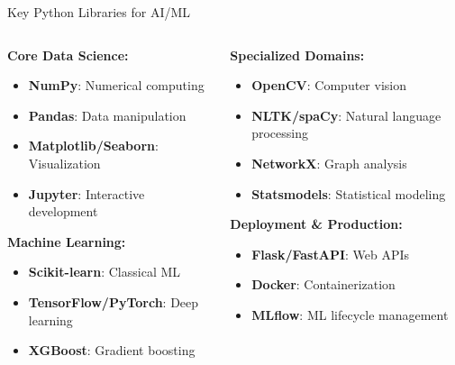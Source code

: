 \begin{frame}{Key Python Libraries for AI/ML}
    \begin{columns}
        \begin{column}{0.5\textwidth}
            \textbf{Core Data Science:}
            \begin{itemize}
                \item \textbf{NumPy}: Numerical computing
                \item \textbf{Pandas}: Data manipulation
                \item \textbf{Matplotlib/Seaborn}: Visualization
                \item \textbf{Jupyter}: Interactive development
            \end{itemize}
            
            \textbf{Machine Learning:}
            \begin{itemize}
                \item \textbf{Scikit-learn}: Classical ML
                \item \textbf{TensorFlow/PyTorch}: Deep learning
                \item \textbf{XGBoost}: Gradient boosting
            \end{itemize}
        \end{column}
        
        \begin{column}{0.5\textwidth}
            \textbf{Specialized Domains:}
            \begin{itemize}
                \item \textbf{OpenCV}: Computer vision
                \item \textbf{NLTK/spaCy}: Natural language processing
                \item \textbf{NetworkX}: Graph analysis
                \item \textbf{Statsmodels}: Statistical modeling
            \end{itemize}
            
            \textbf{Deployment \& Production:}
            \begin{itemize}
                \item \textbf{Flask/FastAPI}: Web APIs
                \item \textbf{Docker}: Containerization
                \item \textbf{MLflow}: ML lifecycle management
            \end{itemize}
        \end{column}
    \end{columns}
\end{frame}

